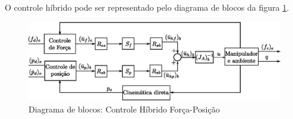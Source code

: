 O controle híbrido pode ser representado pelo diagrama de blocos da figura \ref{fig:hybrid_block}.

\begin{figure}[H]
  \centering
  \includegraphics[width=\linewidth]{./img/hybrid.eps}
  \caption{Diagrama de blocos: Controle Híbrido Força-Posição}
  \label{fig:hybrid_block}
\end{figure}